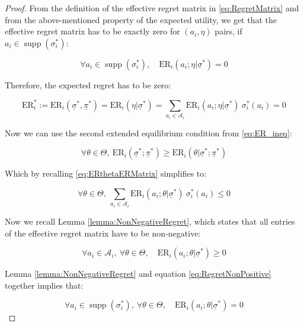 \documentclass{article}
\theoremstyle{definition}
\DeclareMathOperator\supp{supp}
\begin{document}
\begin{proof}
    From the definition of the effective regret matrix in \eqref{eq:RegretMatrix} and from the above-mentioned property of the expected utility, we get that the effective regret matrix has to be exactly zero for $(a_i,\eta)$ pairs, if $a_i \in \supp(\sigma_i^*)$:

    \begin{equation}
        \forall a_i \in \supp(\sigma_i^*), \quad \mathrm{ER}_i(a_i;\eta | \underline{\sigma}^*) = 0
    \end{equation}
    
    Therefore, the expected regret has to be zero:

    \begin{equation}
        \mathrm{ER}_i^* := \mathrm{ER}_i(\underline{\sigma}^*,\underline{\pi}^*) =
        \mathrm{ER}_i(\eta|\underline{\sigma}^*) =
        \sum_{a_i \in \mathcal{A}_i} \mathrm{ER}_i(a_i;\eta | \underline{\sigma}^*) \ \sigma_i^*(a_i) = 0
    \end{equation}

    Now we can use the second extended equilibrium condition from \eqref{eq:ER_ineq}:

    \begin{equation}
        \forall \theta \in \Theta, \  \mathrm{ER}_i(\underline{\sigma}^*;\underline{\pi}^*) \ge \mathrm{ER}_i(\theta | \underline{\sigma}^*;\underline{\pi}^*)
    \end{equation}

    Which by recalling \eqref{eq:ERthetaERMatrix} simplifies to:

    \begin{equation}
    \label{eq:RegretNonPositive}
        \forall \theta \in \Theta, \  \sum_{a_i \in \mathcal{A_i}} \mathrm{ER}_i(a_i;\theta | \underline{\sigma}^*) \ \sigma_i^*(a_i) \le 0
    \end{equation}

    Now we recall Lemma \autoref{lemma:NonNegativeRegret}, which states that all entries of the effective regret matrix have to be non-negative: 

    \begin{equation}
        \forall a_i \in \mathcal{A}_i, \ \forall \theta \in \Theta,  \quad \mathrm{ER}_i(a_i;\theta|\underline{\sigma}^*) \ge 0
    \end{equation}

    Lemma \autoref{lemma:NonNegativeRegret} and equation \eqref{eq:RegretNonPositive} together implies that:

    \begin{equation}
    \label{eq:RegretIsZero}
        \forall a_i \in \supp(\sigma_i^*), \ \forall \theta \in \Theta, \quad
        \mathrm{ER}_i(a_i;\theta|\underline{\sigma}^*) = 0
    \end{equation}


\end{proof}
\end{document}
